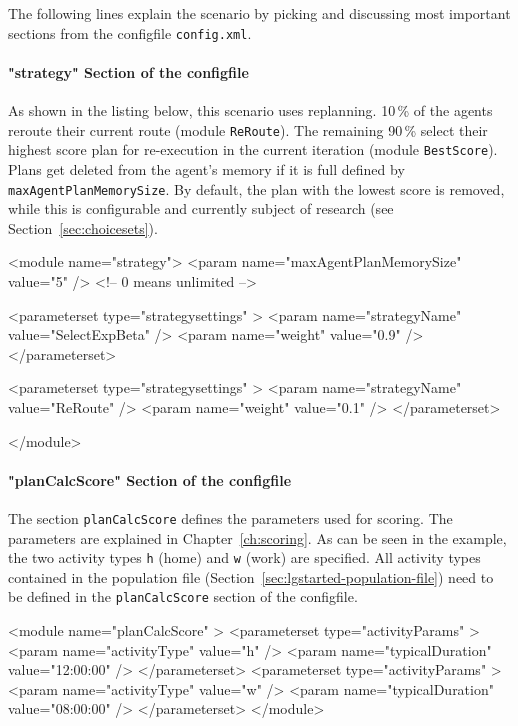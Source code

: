 The following lines explain the scenario by picking and discussing most important sections from the \gls{configfile} \lstinline|config.xml|.


\paragraph{"strategy" Section of the \protect\gls{configfile}}

As shown in the listing below, this scenario uses replanning. 10\,\% of the agents reroute their current route (module \lstinline|ReRoute|). The remaining 90\,\% select their highest score plan for re-execution in the current iteration (module \lstinline|BestScore|). Plans get deleted from the agent's memory if it is full defined by \lstinline|maxAgentPlanMemorySize|. By default, the plan with the lowest score is removed, while this is configurable and currently subject of
research (see Section~\ref{sec:choicesets}).
%
\begin{xml}
<module name="strategy">
	<param name="maxAgentPlanMemorySize" value="5" /> <!-- 0 means unlimited -->
	
	<parameterset type="strategysettings" >
		<param name="strategyName" value="SelectExpBeta" />
		<param name="weight" value="0.9" />
	</parameterset>
	
	<parameterset type="strategysettings" >
		<param name="strategyName" value="ReRoute" />
		<param name="weight" value="0.1" />
	</parameterset>
	
</module>
\end{xml}



\paragraph{"planCalcScore" Section of the \protect\gls{configfile}}

The section \lstinline|planCalcScore| defines the parameters used for scoring. The parameters are explained in Chapter~\ref{ch:scoring}. As can be seen in the example, the two activity types \lstinline|h| (home) and \lstinline|w| (work) are specified.  All activity types contained in the population file (\cf Section~\ref{sec:lgstarted-population-file}) need to be defined in the \lstinline{planCalcScore} section of the \gls{configfile}.
\begin{xml}
<module name="planCalcScore" >
   <parameterset type="activityParams" >
      <param name="activityType" value="h" />
      <param name="typicalDuration" value="12:00:00" />
   </parameterset>
   <parameterset type="activityParams" >
      <param name="activityType" value="w" />
      <param name="typicalDuration" value="08:00:00" />
   </parameterset>
</module>
\end{xml}

